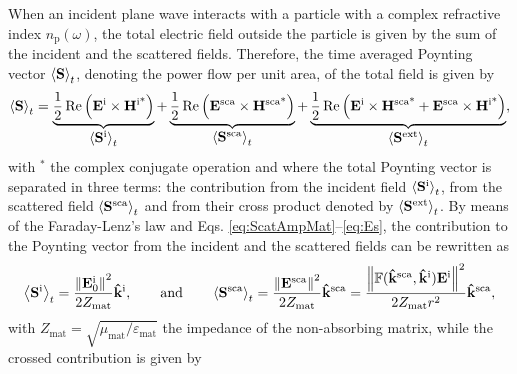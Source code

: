 When an incident plane wave interacts with a particle with a complex refractive index $n_\text{p}(\omega)$, the total electric field outside the particle is given by the sum of the incident and the scattered fields. Therefore, the time averaged Poynting vector $\ev{\vb{S}}_t$, denoting the power flow per unit area, of the total field is given by
%
\begin{align}
	\ev{\vb{S}}_t
		= \underbrace{\frac12 \Re \qty(\vb{E}^\text{i}\times\vb{H}^\text{i*})}_{\text{\normalsize $\ev{\vb{S}^\text{i}}_t $}} +
		  \underbrace{\frac12 \Re \qty(\vb{E}^\text{sca}\times\vb{H}^\text{sca*})}_{\text{\normalsize $\ev{\vb{S}^\text{sca}}_t $}}+
		   \underbrace{	\frac12 \Re\qty(\vb{E}^\text{i}\times\vb{H}^\text{sca*} + \vb{E}^\text{sca}\times\vb{H}^\text{i*})}_{\text{\normalsize$\ev{\vb{S}^\text{ext}}_t$}},
 \label{eq:Stot}
\end{align}
%
with $^*$  the complex conjugate operation and where the total Poynting vector is separated in three terms: the contribution from the incident field $\ev{\vb{S}^\text{i}}_t$, from the scattered field $\ev{\vb{S}^\text{sca}}_t$ and from their cross product denoted by $\ev{\vb{S}^\text{ext}}_t$. By means of the Faraday-Lenz's law and Eqs. \eqref{eq:ScatAmpMat}--\eqref{eq:Es}, the  contribution to the Poynting vector from the incident and the scattered fields can be rewritten as
%
\begin{equation}
	\ev{\vb{S}^\text{i}}_t = \frac{\norm{\vb{E}_0^\text{i}}^2}{2 Z_\text{mat}}\vu{k}^\text{i},
		\qquad\text{and}\qquad
	\ev{\vb{S}^\text{sca}}_t = \frac{\norm{\vb{E}^\text{sca}}^2}{2 Z_\text{mat}}\vu{k}^\text{sca}
						=  \frac{\norm{\mathbb{F}(\vu{k}^\text{sca},\vu{k}^\text{i})\vb{E}^\text{i}}^2}{2 Z_\text{mat}r^2}\vu{k}^\text{sca},
 \label{eq:AvePoyntingISca}
\end{equation}
%
with $Z_\text{mat} = \sqrt{\mu_\text{mat}/\varepsilon_\text{mat}}$ the impedance of the non-absorbing matrix, while the crossed contribution is given by
%
